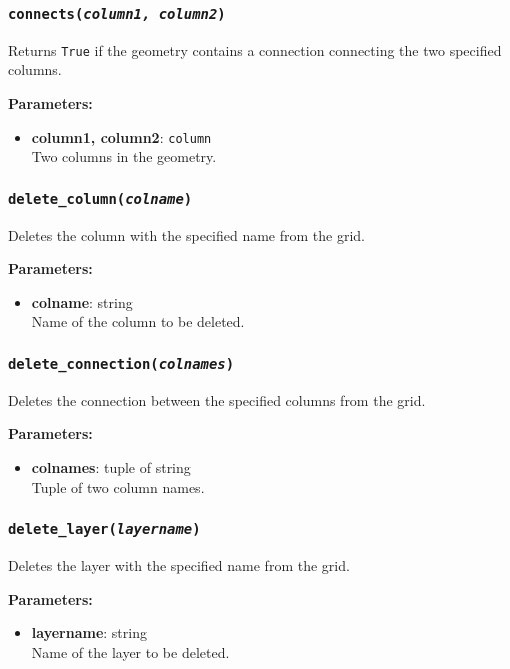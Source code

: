 \subsubsection{\texttt{connects(\emph{column1, column2})}}

Returns \texttt{True} if the geometry contains a connection connecting the two specified columns.

\textbf{Parameters:}
\begin{itemize}
\item \textbf{column1, column2}: \texttt{column}\\
  Two columns in the geometry.
\end{itemize}

\subsubsection{\texttt{delete\_column(\emph{colname})}}

Deletes the column with the specified name from the grid.

\textbf{Parameters:}
\begin{itemize}
\item \textbf{colname}: string\\
  Name of the column to be deleted.
\end{itemize}

\subsubsection{\texttt{delete\_connection(\emph{colnames})}}

Deletes the connection between the specified columns from the grid.

\textbf{Parameters:}
\begin{itemize}
\item \textbf{colnames}: tuple of string\\
  Tuple of two column names.
\end{itemize}

\subsubsection{\texttt{delete\_layer(\emph{layername})}}

Deletes the layer with the specified name from the grid.

\textbf{Parameters:}
\begin{itemize}
\item \textbf{layername}: string\\
  Name of the layer to be deleted.
\end{itemize}

